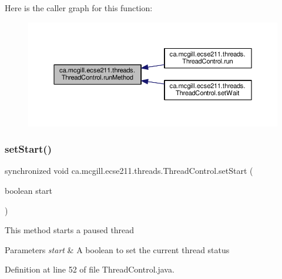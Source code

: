 Here is the caller graph for this function\+:\nopagebreak
\begin{figure}[H]
\begin{center}
\leavevmode
\includegraphics[width=350pt]{classca_1_1mcgill_1_1ecse211_1_1threads_1_1_thread_control_a2959c54bdb6c62c9d5569cdf3ccf2418_icgraph}
\end{center}
\end{figure}
\mbox{\label{classca_1_1mcgill_1_1ecse211_1_1threads_1_1_thread_control_a16221cdc4ccf637b190934549c708e1f}} 
\subsubsection{\texorpdfstring{set\+Start()}{setStart()}}
{\footnotesize\ttfamily synchronized void ca.\+mcgill.\+ecse211.\+threads.\+Thread\+Control.\+set\+Start (\begin{DoxyParamCaption}\item[{boolean}]{start }\end{DoxyParamCaption})}

This method starts a paused thread


\begin{DoxyParams}{Parameters}
{\em start} & A boolean to set the current thread status \\
\hline
\end{DoxyParams}


Definition at line 52 of file Thread\+Control.\+java.



